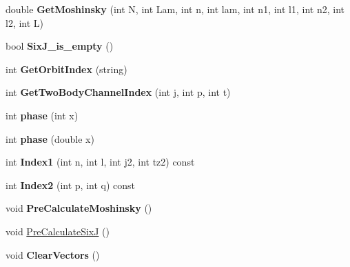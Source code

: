 \begin{DoxyCompactItemize}
\item 
double {\bfseries Get\+Moshinsky} (int N, int Lam, int n, int lam, int n1, int l1, int n2, int l2, int L)\hypertarget{classModelSpace_a85f0b95b2cd46504702ea80489455beb}{}\label{classModelSpace_a85f0b95b2cd46504702ea80489455beb}

\item 
bool {\bfseries Six\+J\+\_\+is\+\_\+empty} ()\hypertarget{classModelSpace_aae435e6ade2addd7787e7948a3ae542c}{}\label{classModelSpace_aae435e6ade2addd7787e7948a3ae542c}

\item 
int {\bfseries Get\+Orbit\+Index} (string)\hypertarget{classModelSpace_a228a41c1c2694793edbc7cd11267a0f2}{}\label{classModelSpace_a228a41c1c2694793edbc7cd11267a0f2}

\item 
int {\bfseries Get\+Two\+Body\+Channel\+Index} (int j, int p, int t)\hypertarget{classModelSpace_ae73e211248e6f2bd4cc1bb0f030144ce}{}\label{classModelSpace_ae73e211248e6f2bd4cc1bb0f030144ce}

\item 
int {\bfseries phase} (int x)\hypertarget{classModelSpace_a6b4d1686088e3fef492df10bbd806fe2}{}\label{classModelSpace_a6b4d1686088e3fef492df10bbd806fe2}

\item 
int {\bfseries phase} (double x)\hypertarget{classModelSpace_a07d1c8f00131cc6c192d440e6be329f3}{}\label{classModelSpace_a07d1c8f00131cc6c192d440e6be329f3}

\item 
int {\bfseries Index1} (int n, int l, int j2, int tz2) const \hypertarget{classModelSpace_ab9e4a36b032abc3fcd81da8b2a8707d2}{}\label{classModelSpace_ab9e4a36b032abc3fcd81da8b2a8707d2}

\item 
int {\bfseries Index2} (int p, int q) const \hypertarget{classModelSpace_acb31fdcb54a8fe3168378969176f0157}{}\label{classModelSpace_acb31fdcb54a8fe3168378969176f0157}

\item 
void {\bfseries Pre\+Calculate\+Moshinsky} ()\hypertarget{classModelSpace_abc436144ee034558058227cac872ecb9}{}\label{classModelSpace_abc436144ee034558058227cac872ecb9}

\item 
void \hyperlink{classModelSpace_abd5c59215d553bd2db47120d2db4b2ea}{Pre\+Calculate\+SixJ} ()
\item 
void {\bfseries Clear\+Vectors} ()\hypertarget{classModelSpace_a25aad2961ae99cdd528c4d71bb689d95}{}\label{classModelSpace_a25aad2961ae99cdd528c4d71bb689d95}


\end{DoxyCompactItemize}
